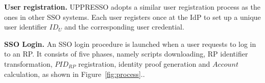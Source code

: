 \noindent\textbf{User registration.} UPPRESSO adopts a similar user registration process as the ones in other SSO systems. Each user registers once at the IdP to set up a unique user identifier $ID_U$ and the corresponding user credential. 

\noindent\textbf{SSO Login.} An SSO login procedure is launched when a user requests to log in to an RP.
It consists of five phases, namely scripts downloading, RP identifier transformation, $PID_{RP}$ registration, identity proof generation and $Account$ calculation, as shown in Figure~\ref{fig:process}..

